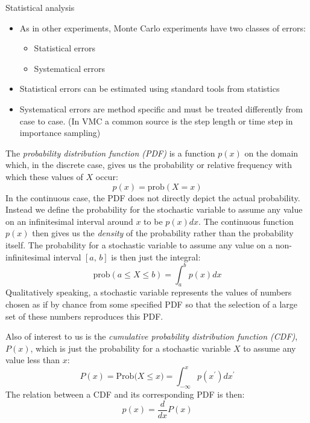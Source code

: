 \documentclass[graybox,sectrefs,envcountresetchap,open=right]{svmonodo}
\begin{document}
 Statistical analysis
\begin{itemize}
    \item As in other experiments, Monte Carlo experiments have two classes of errors:
\begin{itemize}

      \item Statistical errors

      \item Systematical errors

\end{itemize}

\noindent
    \item Statistical errors can be estimated using standard tools from statistics

    \item Systematical errors are method specific and must be treated differently from case to case. (In VMC a common source is the step length or time step in importance sampling)
\end{itemize}

\noindent
The \emph{probability distribution function (PDF)} is a function
$p(x)$ on the domain which, in the discrete case, gives us the
probability or relative frequency with which these values of $X$ occur:
\[
p(x) = \mathrm{prob}(X=x)
\]
In the continuous case, the PDF does not directly depict the
actual probability. Instead we define the probability for the
stochastic variable to assume any value on an infinitesimal interval
around $x$ to be $p(x)dx$. The continuous function $p(x)$ then gives us
the \emph{density} of the probability rather than the probability
itself. The probability for a stochastic variable to assume any value
on a non-infinitesimal interval $[a,\,b]$ is then just the integral:
\[
\mathrm{prob}(a\leq X\leq b) = \int_a^b p(x)dx
\]
Qualitatively speaking, a stochastic variable represents the values of
numbers chosen as if by chance from some specified PDF so that the
selection of a large set of these numbers reproduces this PDF.





Also of interest to us is the \emph{cumulative probability distribution function (CDF)}, $P(x)$, which is just the probability
for a stochastic variable $X$ to assume any value less than $x$:
\[
P(x)=\mathrm{Prob(}X\leq x\mathrm{)} =\int_{-\infty}^x p(x^{\prime})dx^{\prime}
\]
The relation between a CDF and its corresponding PDF is then:
\[
p(x) = \frac{d}{dx}P(x)
\]
\end{document}
